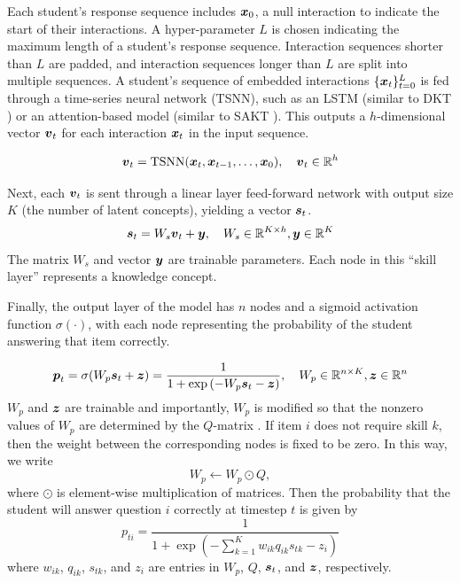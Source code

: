 Each student's response sequence includes $\boldsymbol{x}_0$, a null interaction to indicate the start of their interactions. A hyper-parameter $L$ is chosen indicating the maximum length of a student's response sequence. Interaction sequences shorter than $L$ are padded, and interaction sequences longer than $L$ are split into multiple sequences. A student's sequence of embedded interactions $\{\boldsymbol{x}_t\}_{t=0}^L$ is fed through a time-series neural network (TSNN), such as an LSTM (similar to DKT \cite{piech2015}) or an attention-based model (similar to SAKT \cite{pandey2019}). This outputs a $h$-dimensional vector $\boldsymbol{v}_t$ for each interaction $\boldsymbol{x}_t$ in the input sequence.

\begin{equation}
  \boldsymbol{v}_t = \text{TSNN}(\boldsymbol{x}_t, \boldsymbol{x}_{t-1}, \ldots, \boldsymbol{x}_0), \quad \boldsymbol{v}_t \in \mathbb{R}^h
  \label{eq:tsnn_layer}
\end{equation}

Next, each $\boldsymbol{v}_t$ is sent through a linear layer feed-forward network with output size $K$ (the number of latent concepts), yielding a vector $\boldsymbol{s}_t$.
\begin{equation}
  \boldsymbol{s}_t = W_s \boldsymbol{v}_t + \boldsymbol{y}, \quad W_s \in \mathbb{R}^{K\times h}, \boldsymbol{y} \in \mathbb{R}^K
  \label{eq:skill_layer}
\end{equation}
The matrix $W_s$ and vector $\boldsymbol{y}$ are trainable parameters. Each node in this ``skill layer'' represents a knowledge concept.

Finally, the output layer of the model has $n$ nodes and a sigmoid activation function $\sigma(\cdot)$, with each node representing the probability of the student answering that item correctly.

\begin{equation}
  \boldsymbol{p}_t = \sigma(W_p \boldsymbol{s}_t + \boldsymbol{z}) = \frac{1}{1 + \exp \left( -W_p \boldsymbol{s}_t - \boldsymbol{z} \right)}, \quad W_p \in \mathbb{R}^{n \times K}, \boldsymbol{z} \in \mathbb{R}^n
  \label{eq:pred_layer}
\end{equation}
$W_p$ and $\boldsymbol{z}$ are trainable and importantly, $W_p$ is modified so that the nonzero values of $W_p$ are determined by the $Q$-matrix \cite{guo2017}\cite{ijcnn_paper}. If item $i$ does not require skill $k$, then the weight between the corresponding nodes is fixed to be zero. In this way, we write
\begin{equation}
  W_p \gets W_p \odot Q,
  \label{eq:weight_constraint}
\end{equation}
where $\odot$ is element-wise multiplication of matrices. Then the probability that the student will answer question $i$ correctly at timestep $t$ is given by 
\begin{equation}
  p_{ti} = \frac{1}{1 + \exp\left( -\sum_{k=1}^K w_{ik} q_{ik} s_{tk} - z_i \right)}
  \label{eq:nn_out}
\end{equation}
where $w_{ik}$, $q_{ik}$, $s_{tk}$, and $z_i$ are entries in $W_p$, $Q$, $\boldsymbol{s}_t$, and $\boldsymbol{z}$, respectively.

